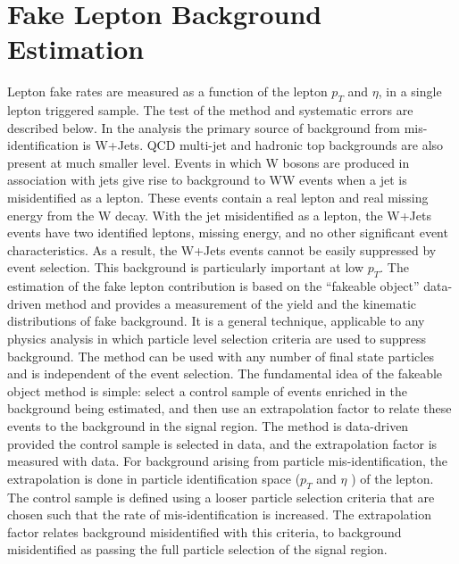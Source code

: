 \section{Fake Lepton Background Estimation}
\label{fk}
Lepton fake rates are measured as a
function of the lepton $p_T$ and $\eta$, in a single lepton triggered sample. The test of the method and
systematic errors are described below.
In the analysis
the primary source of background from mis-identification is W+Jets. QCD multi-jet and hadronic top backgrounds
are also present at much smaller level. Events in which W bosons are produced in association
with jets give rise to background to WW events when a jet is misidentified as a lepton. These
events contain a real lepton and real missing energy from the W decay. With the jet misidentified 
as a lepton, the W+Jets events have two identified leptons, missing energy, and no other
significant event characteristics. As a result, the W+Jets events cannot be easily suppressed
by event selection. This background is particularly important at low $p_T$.
The estimation of the fake lepton contribution is based on the ``fakeable object'' data-driven
method and provides a measurement of the yield and the kinematic distributions of fake background. 
It is a general technique, applicable to any physics analysis in which particle level
selection criteria are used to suppress background. The method can be used with any number
of final state particles and is independent of the event selection.
The fundamental idea of the fakeable object method is simple: select a control sample of events
enriched in the background being estimated, and then use an extrapolation factor to relate these
events to the background in the signal region. The method is data-driven provided the control
sample is selected in data, and the extrapolation factor is measured with data. For background
arising from particle mis-identification, the extrapolation is done in particle identification space
($p_T$ and $\eta$ ) of the lepton. The control sample is defined using a looser particle selection criteria
that are chosen such that the rate of mis-identification is increased. The extrapolation factor
relates background misidentified with this criteria, to background misidentified as passing the
full particle selection of the signal region.



